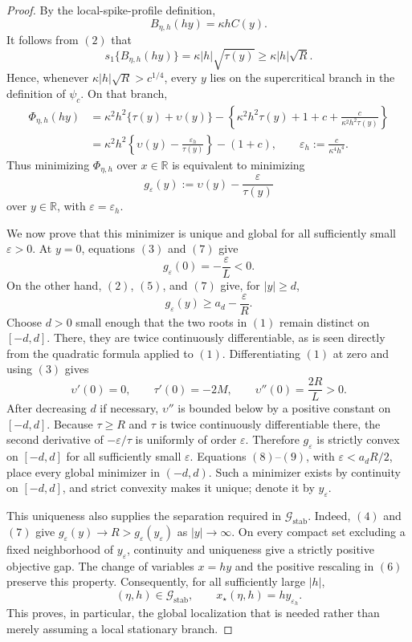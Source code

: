 \documentclass{article}
\begin{document}
\begin{proof}
By the local-spike-profile definition,
\[
 B_{\eta,h}(hy)=\kappa h C(y).
\]
It follows from \((2)\) that
\[
 s_1\{B_{\eta,h}(hy)\}=\kappa|h|\sqrt{\tau(y)}
 \ge \kappa|h|\sqrt R.
\]
Hence, whenever \(\kappa|h|\sqrt R>c^{1/4}\), every \(y\) lies on the supercritical branch in the definition of \(\psi_c\).  On that branch,
\[
 \begin{aligned}
 \Phi_{\eta,h}(hy)
 &=\kappa^2h^2\{\tau(y)+\upsilon(y)\}
   -\left\{\kappa^2h^2\tau(y)+1+c+
   \frac{c}{\kappa^2h^2\tau(y)}\right\}\\
 &=\kappa^2h^2\left\{\upsilon(y)-
   \frac{\varepsilon_h}{\tau(y)}\right\}-(1+c),
 \qquad
 \varepsilon_h:=\frac{c}{\kappa^4h^4}.                            \tag{6}
 \end{aligned}
\]
Thus minimizing \(\Phi_{\eta,h}\) over \(x\in\mathbb R\) is equivalent to minimizing
\[
 g_\varepsilon(y):=\upsilon(y)-\frac{\varepsilon}{\tau(y)}         \tag{7}
\]
over \(y\in\mathbb R\), with \(\varepsilon=\varepsilon_h\).

We now prove that this minimizer is unique and global for all sufficiently small \(\varepsilon>0\).  At \(y=0\), equations \((3)\) and \((7)\) give
\[
 g_\varepsilon(0)=-\frac{\varepsilon}{L}<0.                        \tag{8}
\]
On the other hand, \((2)\), \((5)\), and \((7)\) give, for \(|y|\ge d\),
\[
 g_\varepsilon(y)\ge a_d-\frac{\varepsilon}{R}.                   \tag{9}
\]
Choose \(d>0\) small enough that the two roots in \((1)\) remain distinct on \([-d,d]\).  There, they are twice continuously differentiable, as is seen directly from the quadratic formula applied to \((1)\).  Differentiating \((1)\) at zero and using \((3)\) gives
\[
 \upsilon'(0)=0,\qquad \tau'(0)=-2M,
 \qquad \upsilon''(0)=\frac{2R}{L}>0.                              \tag{10}
\]
After decreasing \(d\) if necessary, \(\upsilon''\) is bounded below by a positive constant on \([-d,d]\).  Because \(\tau\ge R\) and \(\tau\) is twice continuously differentiable there, the second derivative of \(-\varepsilon/\tau\) is uniformly of order \(\varepsilon\).  Therefore \(g_\varepsilon\) is strictly convex on \([-d,d]\) for all sufficiently small \(\varepsilon\).  Equations \((8)\)--\((9)\), with \(\varepsilon<a_dR/2\), place every global minimizer in \((-d,d)\).  Such a minimizer exists by continuity on \([-d,d]\), and strict convexity makes it unique; denote it by \(y_\varepsilon\).

This uniqueness also supplies the separation required in \(\mathcal G_{\mathrm{stab}}\).  Indeed, \((4)\) and \((7)\) give \(g_\varepsilon(y)\to R>g_\varepsilon(y_\varepsilon)\) as \(|y|\to\infty\).  On every compact set excluding a fixed neighborhood of \(y_\varepsilon\), continuity and uniqueness give a strictly positive objective gap.  The change of variables \(x=hy\) and the positive rescaling in \((6)\) preserve this property.  Consequently, for all sufficiently large \(|h|\),
\[
 (\eta,h)\in\mathcal G_{\mathrm{stab}},
 \qquad x_\star(\eta,h)=h y_{\varepsilon_h}.                       \tag{11}
\]
This proves, in particular, the global localization that is needed rather than merely assuming a local stationary branch.


\end{proof}
\end{document}
